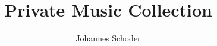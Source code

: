 \documentclass[a4paper,oneside,10pt]{report}
\begin{document}
\setlength{\parindent}{0em}
\pagestyle{empty} %



\title{Private Music Collection}
\author{Johannes Schoder}
\maketitle


\setcounter{page}{109}

\tableofcontents %
\cleardoublepage %

\pagestyle{plain} %



%

%

%

%

\end{document}
